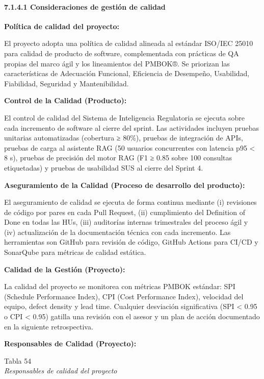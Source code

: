 \documentclass[12pt,a4paper,oneside]{report}
\begin{document}
\paragraph{7.1.4.1 Consideraciones de gestión de
calidad}\label{consideraciones-de-gestiuxf3n-de-calidad}

\textbf{Política de calidad del proyecto:}

El proyecto adopta una política de calidad alineada al estándar ISO/IEC
25010 para calidad de producto de software, complementada con prácticas
de QA propias del marco ágil y los lineamientos del PMBOK®. Se priorizan
las características de Adecuación Funcional, Eficiencia de Desempeño,
Usabilidad, Fiabilidad, Seguridad y Mantenibilidad.

\textbf{Control de la Calidad (Producto):}

El control de calidad del Sistema de Inteligencia Regulatoria se ejecuta
sobre cada incremento de software al cierre del sprint. Las actividades
incluyen pruebas unitarias automatizadas (cobertura ≥ 80\%), pruebas de
integración de APIs, pruebas de carga al asistente RAG (50 usuarios
concurrentes con latencia p95 \textless{} 8 s), pruebas de precisión del
motor RAG (F1 ≥ 0.85 sobre 100 consultas etiquetadas) y pruebas de
usabilidad SUS al cierre del Sprint 4.

\textbf{Aseguramiento de la Calidad (Proceso de desarrollo del
producto):}

El aseguramiento de calidad se ejecuta de forma continua mediante (i)
revisiones de código por pares en cada Pull Request, (ii) cumplimiento
del Definition of Done en todas las HUs, (iii) auditorías internas
trimestrales del proceso ágil y (iv) actualización de la documentación
técnica con cada incremento. Las herramientas son GitHub para revisión
de código, GitHub Actions para CI/CD y SonarQube para métricas de
calidad estática.

\textbf{Calidad de la Gestión (Proyecto):}

La calidad del proyecto se monitorea con métricas PMBOK estándar: SPI
(Schedule Performance Index), CPI (Cost Performance Index), velocidad
del equipo, defect density y lead time. Cualquier desviación
significativa (SPI \textless{} 0.95 o CPI \textless{} 0.95) gatilla una
revisión con el asesor y un plan de acción documentado en la siguiente
retrospectiva.

\textbf{Responsables de Calidad (Proyecto):}

\label{_Toc231672309}{}Tabla 54\\
\emph{Responsables de calidad del proyecto}
\end{document}
